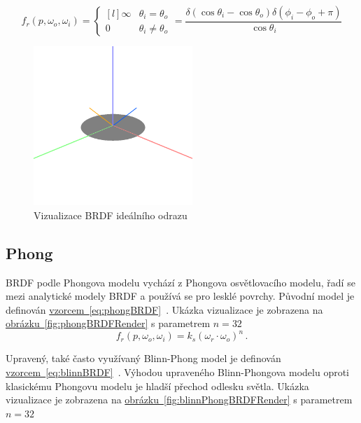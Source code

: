 \documentclass[czech,master]{diploma}
\newcommand{\point}{p}
\newcommand{\brdf}{f_r\left(\point,\omega_{o},\omega_{i}\right)}
\newcommand{\outVec}{\omega_{o}}
\newcommand{\refl}{\omega_{r}}
\begin{document}
\begin{equation} \label{eq:idealReflectionBRDF}
  \brdf  =  \left\{\begin{matrix*}[l] \infty & \theta_i = \theta_o \\ 0 & \theta_i \neq \theta_o \end{matrix*}\right. = \frac{\delta\left(\cos\theta_i-\cos\theta_o\right)\delta\left(\phi_i-\phi_o+\pi\right)}{\cos\theta_i}
\end{equation}


\begin{figure}[ht]%
  \centering
  \includegraphics[width=6cm]{Figures/visualizations/brdfMirror.png}
  \caption{Vizualizace BRDF ideálního odrazu}%
  \label{fig:idealReflectionBRDFViz}%
\end{figure}


\subsection{Phong} \label{sec:Phong}
BRDF podle Phongova modelu vychází z Phongova osvětlovacího modelu, řadí se mezi analytické modely BRDF a používá se pro lesklé povrchy. Původní model je definován \hyperref[eq:phongBRDF]{vzorcem~\ref{eq:phongBRDF}}~\cite{Phong1975}. Ukázka vizualizace je zobrazena na \hyperref[fig:phongBRDFRender]{obrázku~\ref{fig:phongBRDFRender}} s parametrem \(n = 32\)
\begin{equation} \label{eq:phongBRDF}
  \brdf = k_s{(\refl\cdot\outVec)}^{n}\,.
\end{equation}

Upravený, také často využívaný Blinn-Phong model je definován \hyperref[eq:blinnBRDF]{vzorcem~\ref{eq:blinnBRDF}}~\cite{BlinnPhong1977}. Výhodou upraveného Blinn-Phongova modelu oproti klasickému Phongovu modelu je hladší přechod odlesku světla. Ukázka vizualizace je zobrazena na \hyperref[fig:blinnPhongBRDFRender]{obrázku~\ref{fig:blinnPhongBRDFRender}} s parametrem \(n = 32\)
\end{document}
